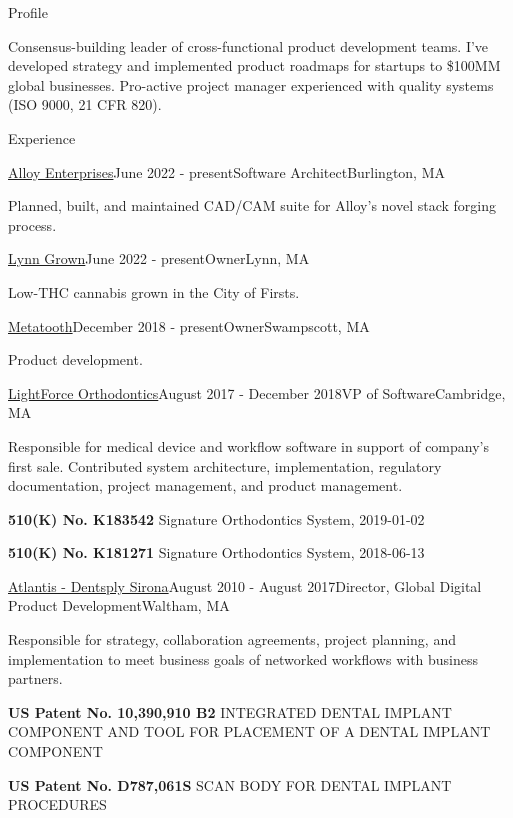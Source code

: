\documentclass{resume}
\begin{document}
  
\begin{rSection}{Profile}
\item Consensus-building leader of cross-functional product development teams. I've developed strategy and implemented product roadmaps for startups to \$100MM global businesses. Pro-active project manager experienced with quality systems (ISO 9000, 21 CFR 820).
\end{rSection}

\begin{rSection}{Experience}

\begin{rSubsection}{\href{https://alloyenterprises.co}{Alloy Enterprises}}{June 2022 - present}{Software Architect}{Burlington, MA}
\item Planned, built, and maintained CAD/CAM suite for Alloy's novel stack forging process.
\end{rSubsection}

\begin{rSubsection}{\href{https://lynngrown.com}{Lynn Grown}}{June 2022 - present}{Owner}{Lynn, MA}
\item Low-THC cannabis grown in the City of Firsts.
\end{rSubsection}

\begin{rSubsection}{\href{https://metatooth.com}{Metatooth}}{December 2018 - present}{Owner}{Swampscott, MA}
\item Product development.
\end{rSubsection}

\begin{rSubsection}{\href{https://lightforceortho.com}{LightForce Orthodontics}}{August 2017 - December 2018}{VP of Software}{Cambridge, MA}
\item Responsible for medical device and workflow software in support of company's first sale. Contributed system architecture, implementation, regulatory documentation, project management, and product management.
\item \textbf{510(K) No. K183542} Signature Orthodontics System, 2019-01-02
\item \textbf{510(K) No. K181271} Signature Orthodontics System, 2018-06-13
\end{rSubsection}


\begin{rSubsection}{\href{https://dentsplysirona.com}{Atlantis - Dentsply Sirona}}{August 2010 - August 2017}{Director, Global Digital Product Development}{Waltham, MA}
\item Responsible for strategy, collaboration agreements, project planning, and implementation to meet business goals of networked workflows with business partners.
\item \textbf{US Patent No. 10,390,910 B2} INTEGRATED DENTAL IMPLANT COMPONENT AND TOOL FOR PLACEMENT OF A DENTAL IMPLANT COMPONENT
\item \textbf{US Patent No. D787,061S} SCAN BODY FOR DENTAL IMPLANT PROCEDURES
\end{rSubsection}


\end{rSection}
\end{document}
